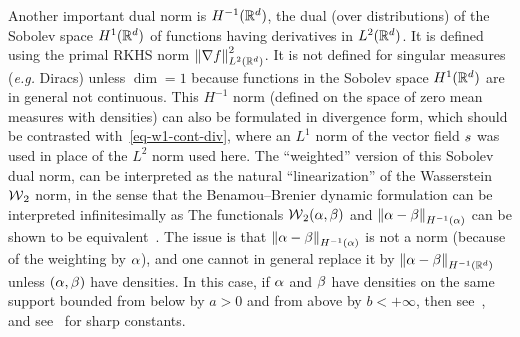 \begin{example}[$H^{-1}(\RR^\dim)$]\label{exp-sobolev-neg1}
Another important dual norm is $H^{-1}(\RR^\dim)$, the dual (over distributions) of the Sobolev space $H^1(\mathbb{R}^d)$ of functions having derivatives in $L^2(\mathbb{R}^d)$.
%
It is defined using the primal RKHS norm $\left\| \nabla f \right\|_{L^2(\mathbb{R}^d)}^2$. It is not defined for singular measures (\emph{e.g.} Diracs) unless $\dim=1$ because functions in the Sobolev space $H^1(\mathbb{R}^d)$ are in general not continuous.
%
This $H^{-1}$ norm (defined on the space of zero mean measures with densities) can also be formulated in divergence form,
which should be contrasted with~\eqref{eq-w1-cont-div}, where an $L^1$ norm of the vector field $s$ was used in place of the $L^2$ norm used here.
%
The ``weighted'' version of this Sobolev dual norm,
can be interpreted as the natural ``linearization'' of the Wasserstein $\operatorname{\mathcal{W}}_2$ norm, in the sense that the Benamou--Brenier dynamic formulation can be interpreted infinitesimally as 
The functionals $\operatorname{\mathcal{W}}_2(\alpha,\beta)$ and $\left\| \alpha-\beta \right\|_{H^{-1}(\alpha)}$ can be shown to be equivalent~\citep{peyre2011comparison}.
%
The issue is that $\left\| \alpha-\beta \right\|_{H^{-1}(\alpha)}$ is not a norm (because of the weighting by $\alpha$), and one cannot in general replace it by $\left\| \alpha-\beta \right\|_{H^{-1}(\mathbb{R}^d)}$ unless $(\alpha,\beta)$ have densities. 
%
In this case, if $\alpha$ and $\beta$ have densities on the same support bounded from below by $a>0$ and from above by $b<+\infty$, then 
see~\citep[Theo. 5.34]{SantambrogioBook}, and see~\citep{peyre2011comparison} for sharp constants. 
%
\end{example}

